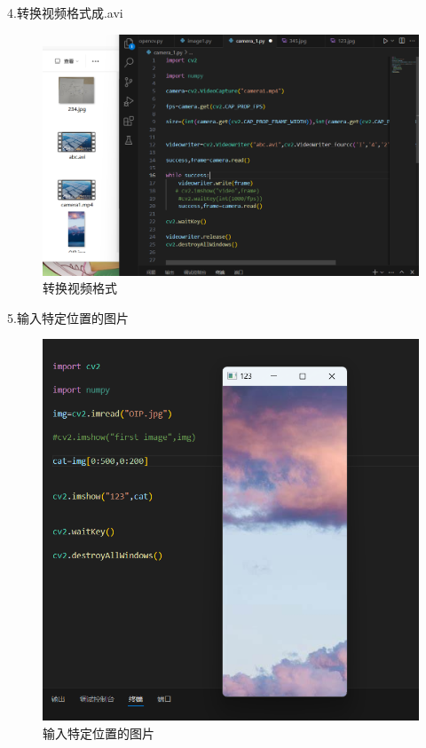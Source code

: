 \documentclass[a4paper, 12pt]{article}
\begin{document}
4.转换视频格式成.avi
\begin{figure}[H]
  \centering
  \includegraphics[width=1\textwidth]{屏幕截图 2024-09-12 160329.png}
  \caption{转换视频格式}
    \end{figure}

5.输入特定位置的图片
\begin{figure}[H]
  \centering
  \includegraphics[width=1\textwidth]{屏幕截图 2024-09-12 164317.png}
  \caption{输入特定位置的图片}
    \end{figure}
\end{document}
